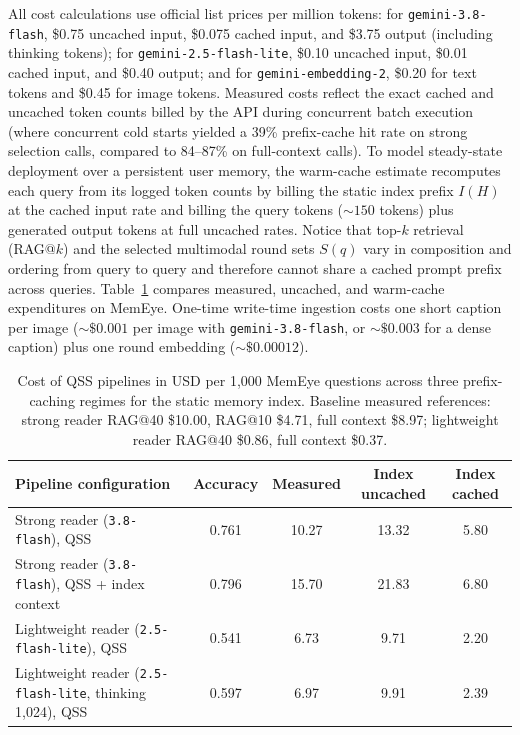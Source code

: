 \documentclass[10pt]{article}
\newcommand{\qss}{QSS}
\begin{document}
All cost calculations use official list prices per million tokens: for \texttt{gemini-3.8-flash}, \$0.75 uncached input, \$0.075 cached input, and \$3.75 output (including thinking tokens); for \texttt{gemini-2.5-flash-lite}, \$0.10 uncached input, \$0.01 cached input, and \$0.40 output; and for \texttt{gemini-embedding-2}, \$0.20 for text tokens and \$0.45 for image tokens. Measured costs reflect the exact cached and uncached token counts billed by the API during concurrent batch execution (where concurrent cold starts yielded a 39\% prefix-cache hit rate on strong selection calls, compared to 84--87\% on full-context calls). To model steady-state deployment over a persistent user memory, the warm-cache estimate recomputes each query from its logged token counts by billing the static index prefix $I(H)$ at the cached input rate and billing the query tokens ($\sim 150$ tokens) plus generated output tokens at full uncached rates. Notice that top-$k$ retrieval (RAG@$k$) and the selected multimodal round sets $S(q)$ vary in composition and ordering from query to query and therefore cannot share a cached prompt prefix across queries. Table~\ref{tab:cost} compares measured, uncached, and warm-cache expenditures on MemEye. One-time write-time ingestion costs one short caption per image ($\sim \$0.001$ per image with \texttt{gemini-3.8-flash}, or $\sim \$0.003$ for a dense caption) plus one round embedding ($\sim \$0.00012$).

\begin{table}[h]
\centering
\caption{Cost of \qss{} pipelines in USD per 1,000 MemEye questions across three prefix-caching regimes for the static memory index. Baseline measured references: strong reader RAG@40 \$10.00, RAG@10 \$4.71, full context \$8.97; lightweight reader RAG@40 \$0.86, full context \$0.37.}
\label{tab:cost}
\small
\begin{tabular}{lcccc}
\toprule
Pipeline configuration & Accuracy & Measured & Index uncached & Index cached \\
\midrule
Strong reader (\texttt{3.8-flash}), \qss{} & 0.761 & 10.27 & 13.32 & 5.80 \\
Strong reader (\texttt{3.8-flash}), \qss{} + index context & 0.796 & 15.70 & 21.83 & 6.80 \\
Lightweight reader (\texttt{2.5-flash-lite}), \qss{} & 0.541 & 6.73 & 9.71 & 2.20 \\
Lightweight reader (\texttt{2.5-flash-lite}, thinking 1,024), \qss{} & 0.597 & 6.97 & 9.91 & 2.39 \\
\bottomrule
\end{tabular}
\end{table}
\end{document}
